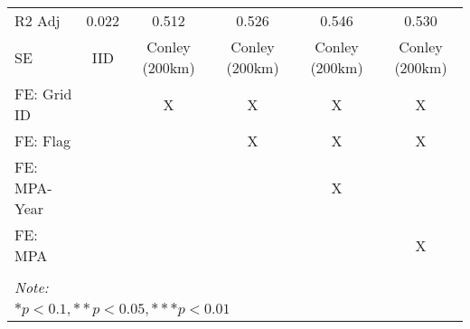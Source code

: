 \begin{table}
\begin{tabular}[t]{lccccc}
\hspace{1em}R2 Adj & 0.022 & 0.512 & 0.526 & 0.546 & 0.530\\
\hspace{1em}SE & IID & Conley (200km) & Conley (200km) & Conley (200km) & Conley (200km)\\
\midrule
FE: Grid ID &  & X & X & X & X\\
FE: Flag &  &  & X & X & X\\
FE: MPA-Year &  &  &  & X & \\
FE: MPA &  &  &  &  & X\\
\midrule\\
\bottomrule
\multicolumn{6}{l}{\rule{0pt}{1em}\textit{Note: }}\\
\multicolumn{6}{l}{\rule{0pt}{1em}$* p < 0.1, ** p < 0.05, *** p < 0.01$}\\
\end{tabular}
\end{table}